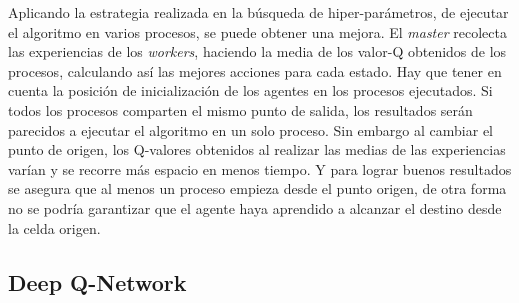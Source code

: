 		Aplicando la estrategia realizada en la búsqueda de hiper-parámetros, de ejecutar el algoritmo en varios procesos, se puede obtener una mejora. El \textit{master} recolecta las experiencias de los \textit{workers}, haciendo la media de los valor-Q obtenidos de los procesos, calculando así las mejores acciones para cada estado. Hay que tener en cuenta la posición de inicialización de los agentes en los procesos ejecutados. Si todos los procesos comparten el mismo punto de salida, los resultados serán parecidos a ejecutar el algoritmo en un solo proceso. Sin embargo al cambiar el punto de origen, los Q-valores obtenidos al realizar las medias de las experiencias varían y se recorre más espacio en menos tiempo. Y para lograr buenos resultados se asegura que al menos un proceso empieza desde el punto origen, de otra forma no se podría garantizar que el agente haya aprendido a alcanzar el destino desde la celda origen.			
			
			
	
	
	
	
	\subsection{Deep Q-Network}
	
